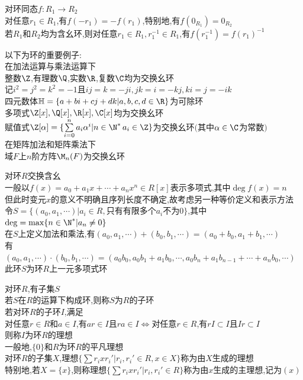 \begin{dingli}
对环同态$f:R_1\to R_2$\\
对任意$r_1\in R_1$,有$f(-r_1)=-f(r_1)$,特别地,有$f(0_{R_1})=0_{R_2}$\\
若$R_1$和$R_2$均为含幺环,则对任意$r_1\in R_1,r_1^{-1}\in R_1$,有$f(r_1^{-1})=f(r_1)^{-1}$
\end{dingli}

\begin{liz}
以下为环的重要例子:\\
在加法运算与乘法运算下\\
整数$\Z$,有理数$\Q$,实数$\R$,复数$\C$均为交换幺环\\
记$i^2=j^2=k^2=-1$且$ij=k=-ji,jk=i=-kj,ki=j=-ik$\\
四元数体$\mathbb{H}=\{a+bi+cj+dk|a,b,c,d\in \R\}$为可除环\\
多项式$\Z[x],\Q[x],\R[x],\C[x]$均为交换幺环\\
赋值式$\Z[\alpha]=\{\sum\limits_{i=0}^{n}a_i\alpha^i|n\in \N^*\,a_i\in \Z\}$为交换幺环$($其中$\alpha\in \C$为常数$)$\\
在矩阵加法和矩阵乘法下\\
域$F$上$n$阶方阵$\M_n(F)$为交换幺环
\end{liz}

\begin{zhu}
对环$R$交换含幺\\
一般以$f(x)=a_0+a_1x+\cdots+a_nx^n\in R[x]$表示多项式,其中$\deg f(x)=n$\\
但此时变元$x$的意义不明确且序列长度不确定,故考虑另一种等价定义和表示方法\\
令$S=\{(a_0,a_1,\cdots)|a_i\in R,\text{只有有限多个}a_i\text{不为}0\}$,其中$\deg =\max\{n\in \N^*|a_n\neq 0\}$\\
在$S$上定义加法和乘法,有$(a_0,a_1,\cdots)+(b_0,b_1,\cdots)=(a_0+b_0,a_1+b_1,\cdots)$\\
有$(a_0,a_1,\cdots)\cdot(b_0,b_1,\cdots)=(a_0b_0,a_0b_1+a_1b_0,\cdots,a_0b_n+a_1b_{n-1}+\cdots+a_nb_0,\cdots)$\\
此环$S$为环$R$上一元多项式环
\end{zhu}

\begin{dingyi}
对环$R$,有子集$S$\\
若$S$在$R$的运算下构成环,则称$S$为$R$的子环\\
若对环$R$的子环$I$,满足\\
对任意$r\in R$和$a\in I$,有$ar\in I$且$ra\in I$$\Leftrightarrow$对任意$r\in R$,有$rI\subset I$且$Ir\subset I$\\
则称$I$为环$R$的理想\\
一般地,$\{0\}$和$R$为环$R$的平凡理想\\
对环$R$的子集$X$,理想$\{\sum r_ixr_i'|r_i,r_i'\in R,x\in X\}$称为由$X$生成的理想\\
特别地,若$X=\{x\}$,则称理想$\{\sum r_ixr_i'|r_i,r_i'\in R\}$称为由$x$生成的主理想,记为$(x)$
\end{dingyi}

